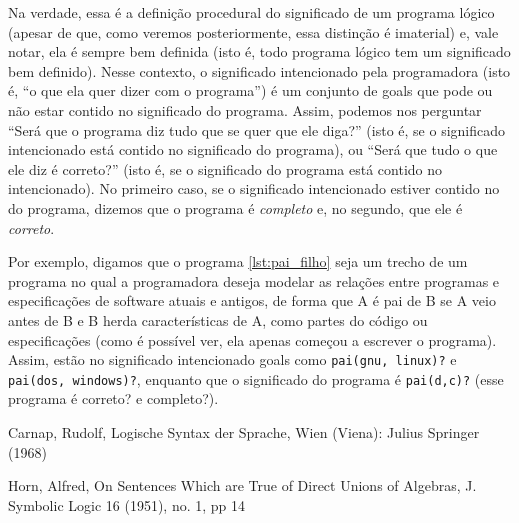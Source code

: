 \documentclass{article}
\begin{document}
  Na verdade, essa é a definição procedural do significado de um programa lógico (apesar de que, como veremos posteriormente, essa distinção é imaterial) e, vale notar, ela é sempre bem definida (isto é, todo programa lógico tem um significado bem definido). Nesse contexto, o significado intencionado pela programadora (isto é, ``o que ela quer dizer com o programa'') é um conjunto de goals que pode ou não estar contido no significado do programa. Assim, podemos nos perguntar ``Será que o
  programa diz tudo que se quer que ele diga?'' (isto é, se o significado intencionado está contido no significado do programa), ou ``Será que tudo o que ele diz é correto?'' (isto é, se o significado do programa está contido no intencionado). No primeiro caso, se o significado intencionado estiver contido no do programa, dizemos que o programa é \textit{completo} e, no segundo, que ele é \textit{correto}.

  Por exemplo, digamos que o programa \ref{lst:pai_filho}  seja um trecho de um programa no qual a programadora deseja modelar as relações entre programas e especificações de software atuais e antigos, de forma que A é pai de B se A veio antes de B e B herda características de A, como partes do código ou especificações (como é possível ver, ela apenas começou a escrever o programa). Assim, estão no significado intencionado goals como {\tt pai(gnu, linux)?} e {\tt pai(dos, windows)?}, enquanto que o
  significado do programa é {\tt pai(d,c)?} (esse programa é correto? e completo?).


  \begin{thebibliography}{1}

     Carnap, Rudolf,
     Logische Syntax der Sprache,
     Wien (Viena): Julius Springer (1968)

     Horn, Alfred,
     On Sentences Which are True of Direct Unions of Algebras,
     J. Symbolic Logic 16 (1951),
     no. 1,
     pp 14

  \end{thebibliography}
\end{document}
